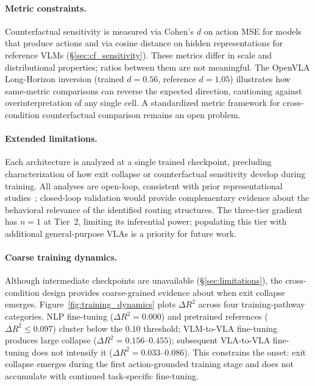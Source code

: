\paragraph{Metric constraints.}
Counterfactual sensitivity is measured via Cohen's $d$ on action MSE for models that produce actions and via cosine distance on hidden representations for reference VLMs (\S\ref{sec:cf_sensitivity}).
These metrics differ in scale and distributional properties; ratios between them are not meaningful.
The OpenVLA Long-Horizon inversion (trained $d = 0.56$, reference $d = 1.05$) illustrates how same-metric comparisons can reverse the expected direction, cautioning against overinterpretation of any single cell.
A standardized metric framework for cross-condition counterfactual comparison remains an open problem.

\paragraph{Extended limitations.}
Each architecture is analyzed at a single trained checkpoint, precluding characterization of how exit collapse or counterfactual sensitivity develop during training.
All analyses are open-loop, consistent with prior representational studies~\cite{grant2026,haon2025}; closed-loop validation would provide complementary evidence about the behavioral relevance of the identified routing structures.
The three-tier gradient has $n = 1$ at Tier~2, limiting its inferential power; populating this tier with additional general-purpose VLAs is a priority for future work.

\paragraph{Coarse training dynamics.}
Although intermediate checkpoints are unavailable (\S\ref{sec:limitations}), the cross-condition design provides coarse-grained evidence about when exit collapse emerges.
Figure~\ref{fig:training_dynamics} plots $\Delta R^2$ across four training-pathway categories.
NLP fine-tuning ($\Delta R^2 = 0.000$) and pretrained references ($\Delta R^2 \leq 0.097$) cluster below the $0.10$ threshold; VLM-to-VLA fine-tuning produces large collapse ($\Delta R^2 = 0.156$--$0.455$); subsequent VLA-to-VLA fine-tuning does not intensify it ($\Delta R^2 = 0.033$--$0.086$).
This constrains the onset: exit collapse emerges during the first action-grounded training stage and does not accumulate with continued task-specific fine-tuning.


